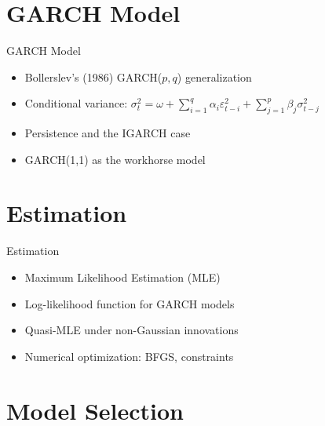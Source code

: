 \documentclass[9pt, aspectratio=169, t]{beamer}
\theoremstyle{definition}
\begin{document}
\section{GARCH Model}

\begin{frame}{GARCH Model}
    \begin{itemize}
        \item Bollerslev's (1986) GARCH($p,q$) generalization
        \item Conditional variance: $\sigma_t^2 = \omega + \sum_{i=1}^{q} \alpha_i \varepsilon_{t-i}^2 + \sum_{j=1}^{p} \beta_j \sigma_{t-j}^2$
        \item Persistence and the IGARCH case
        \item GARCH(1,1) as the workhorse model
    \end{itemize}
\end{frame}

\section{Estimation}

\begin{frame}{Estimation}
    \begin{itemize}
        \item Maximum Likelihood Estimation (MLE)
        \item Log-likelihood function for GARCH models
        \item Quasi-MLE under non-Gaussian innovations
        \item Numerical optimization: BFGS, constraints
    \end{itemize}
\end{frame}

\section{Model Selection}
\end{document}
